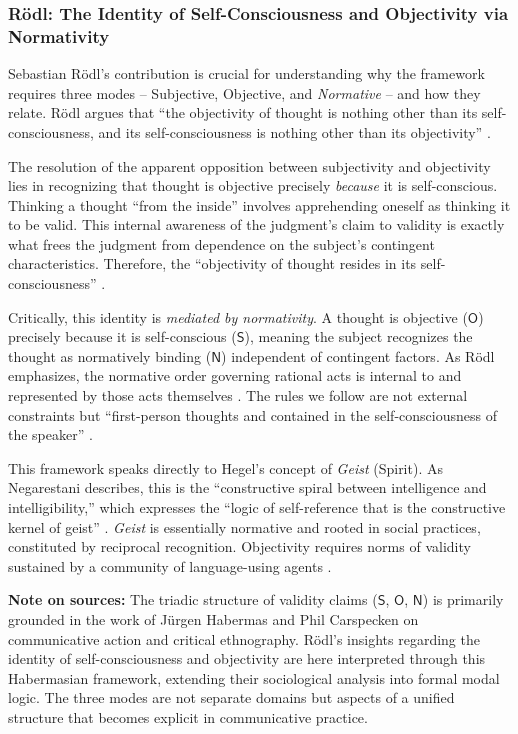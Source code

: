 \documentclass[12pt]{book}
\begin{document}
\subsubsection{Rödl: The Identity of Self-Consciousness and Objectivity via Normativity}

Sebastian Rödl's contribution is crucial for understanding why the framework requires three modes -- Subjective, Objective, and \textit{Normative} -- and how they relate. Rödl argues that ``the objectivity of thought is nothing other than its self-consciousness, and its self-consciousness is nothing other than its objectivity'' \parencite[11]{Rodl:2018aa}.

The resolution of the apparent opposition between subjectivity and objectivity lies in recognizing that thought is objective precisely \textit{because} it is self-conscious. Thinking a thought ``from the inside'' involves apprehending oneself as thinking it to be valid. This internal awareness of the judgment's claim to validity is exactly what frees the judgment from dependence on the subject's contingent characteristics. Therefore, the ``objectivity of thought resides in its self-consciousness'' \parencite[11]{Rodl:2018aa}.

Critically, this identity is \textit{mediated by normativity}. A thought is objective ($\mathsf{O}$) precisely because it is self-conscious ($\mathsf{S}$), meaning the subject recognizes the thought as normatively binding ($\mathsf{N}$) independent of contingent factors. As Rödl emphasizes, the normative order governing rational acts is internal to and represented by those acts themselves \parencite{Rodl:2007aa, Negarestani2018}. The rules we follow are not external constraints but ``first-person thoughts and contained in the self-consciousness of the speaker'' \parencite[33]{Rodl:2018aa}.

This framework speaks directly to Hegel's concept of \textit{Geist} (Spirit). As Negarestani describes, this is the ``constructive spiral between intelligence and intelligibility,'' which expresses the ``logic of self-reference that is the constructive kernel of geist'' \parencite[25]{Negarestani2018}. \textit{Geist} is essentially normative and rooted in social practices, constituted by reciprocal recognition. Objectivity requires norms of validity sustained by a community of language-using agents \parencite{Negarestani2018}.

\textbf{Note on sources:} The triadic structure of validity claims ($\mathsf{S}$, $\mathsf{O}$, $\mathsf{N}$) is primarily grounded in the work of Jürgen Habermas and Phil Carspecken on communicative action and critical ethnography. Rödl's insights regarding the identity of self-consciousness and objectivity are here interpreted through this Habermasian framework, extending their sociological analysis into formal modal logic. The three modes are not separate domains but aspects of a unified structure that becomes explicit in communicative practice.
\end{document}

